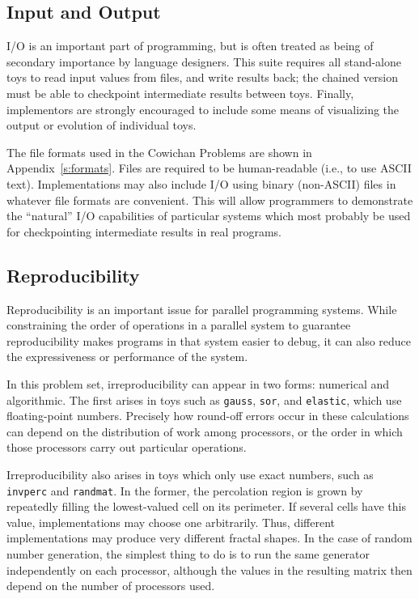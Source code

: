 \subsection{Input and Output\label{s:issues-io}}

I/O is an important part of programming,
but is often treated as being of secondary importance by language designers.
This suite requires all stand-alone toys to read input values from files, and write results back;
the chained version must be able to checkpoint intermediate results between toys.
Finally,
implementors are strongly encouraged to include some means of visualizing the output or evolution of individual toys.

The file formats used in the Cowichan Problems are shown in Appendix~\ref{s:formats}.
Files are required to be human-readable (i.e., to use ASCII text).
Implementations may also include I/O using binary (non-ASCII) files
in whatever file formats are convenient.
This will allow programmers to demonstrate the ``natural'' I/O capabilities of particular systems
which most probably be used for checkpointing intermediate results in real programs.

\subsection{Reproducibility\label{s:issues-reproduce}}

Reproducibility is an important issue for parallel programming systems.
While constraining the order of operations in a parallel system to guarantee reproducibility makes programs in that system easier to debug,
it can also reduce the expressiveness or performance of the system.

In this problem set, irreproducibility can appear in two forms: numerical and algorithmic.
The first arises in toys such as {\tt{gauss}}, {\tt{sor}}, and {\tt{elastic}}, which use floating-point numbers.
Precisely how round-off errors occur in these calculations can depend on the distribution of work among processors,
or the order in which those processors carry out particular operations.

Irreproducibility also arises in toys which only use exact numbers, such as {\tt{invperc}} and {\tt{randmat}}.
In the former, the percolation region is grown by repeatedly filling the lowest-valued cell on its perimeter.
If several cells have this value, implementations may choose one arbitrarily.
Thus, different implementations may produce very different fractal shapes.
In the case of random number generation, the simplest thing to do is to run the same generator independently on each processor,
although the values in the resulting matrix then depend on the number of processors used.
